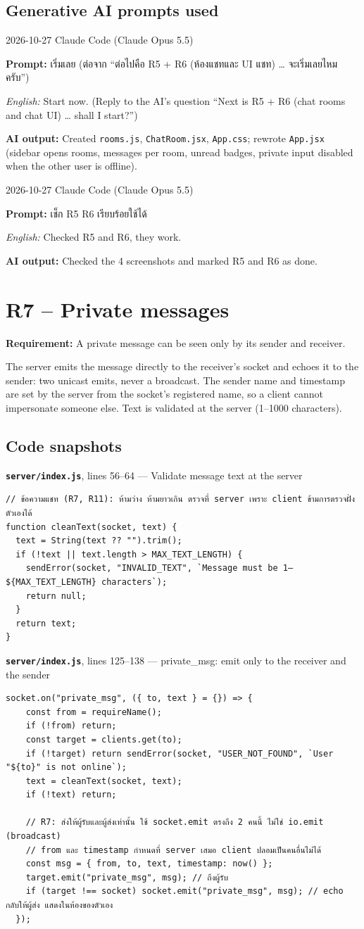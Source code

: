 \documentclass[11pt,a4paper]{article}
\newcommand{\code}[1]{\texttt{#1}}
\newcommand{\req}[1]{\begin{tcolorbox}[colback=accent!6,colframe=accent!60,boxrule=0.5pt,left=4pt,right=4pt,top=2pt,bottom=2pt]\textbf{Requirement:} #1\end{tcolorbox}}
\newcommand{\snap}[3]{\par\medskip\textbf{\code{#1}}, lines #2 --- #3}
\newcommand{\promptbox}[4]{%
\begin{tcolorbox}[colback=codebg,colframe=gray!50,boxrule=0.4pt,left=4pt,right=4pt,top=2pt,bottom=2pt]
{\small #1 \quad Claude Code (Claude Opus 5.5)}\par
\textbf{Prompt:} #2\par
\textit{English:} #3\par
\textbf{AI output:} #4
\end{tcolorbox}}
\begin{document}
\subsection*{Generative AI prompts used}
\promptbox{2026-10-27}{เริ่มเลย \newline (ต่อจาก “ต่อไปคือ R5 + R6 (ห้องแชทและ UI แชท) \ldots{} จะเริ่มเลยไหมครับ”)}{Start now. (Reply to the AI's question “Next is R5 + R6 (chat rooms and chat UI) \ldots{} shall I start?”)}{Created \code{rooms.js}, \code{ChatRoom.jsx}, \code{App.css}; rewrote \code{App.jsx} (sidebar opens rooms, messages per room, unread badges, private input disabled when the other user is offline).}
\promptbox{2026-10-27}{เช็ก R5 R6 เรียบร้อยใช้ได้}{Checked R5 and R6, they work.}{Checked the 4 screenshots and marked R5 and R6 as done.}

\clearpage
\section{R7 -- Private messages}
\req{A private message can be seen only by its sender and receiver.}

The server emits the message directly to the receiver's socket and echoes it to the
sender: two unicast emits, never a broadcast. The sender name and timestamp are set by the server
from the socket's registered name, so a client cannot impersonate someone else. Text is validated at
the server (1--1000 characters).

\subsection*{Code snapshots}
\snap{server/index.js}{56--64}{Validate message text at the server}
\begin{Verbatim}[firstnumber=56]
// ข้อความแชท (R7, R11): ห้ามว่าง ห้ามยาวเกิน ตรวจที่ server เพราะ client ข้ามการตรวจฝั่งตัวเองได้
function cleanText(socket, text) {
  text = String(text ?? "").trim();
  if (!text || text.length > MAX_TEXT_LENGTH) {
    sendError(socket, "INVALID_TEXT", `Message must be 1–${MAX_TEXT_LENGTH} characters`);
    return null;
  }
  return text;
}
\end{Verbatim}

\snap{server/index.js}{125--138}{private\_msg: emit only to the receiver and the sender}
\begin{Verbatim}[firstnumber=125]
  socket.on("private_msg", ({ to, text } = {}) => {
    const from = requireName();
    if (!from) return;
    const target = clients.get(to);
    if (!target) return sendError(socket, "USER_NOT_FOUND", `User "${to}" is not online`);
    text = cleanText(socket, text);
    if (!text) return;

    // R7: ส่งให้ผู้รับและผู้ส่งเท่านั้น ใช้ socket.emit ตรงถึง 2 คนนี้ ไม่ใช่ io.emit (broadcast)
    // from และ timestamp กำหนดที่ server เสมอ client ปลอมเป็นคนอื่นไม่ได้
    const msg = { from, to, text, timestamp: now() };
    target.emit("private_msg", msg); // ถึงผู้รับ
    if (target !== socket) socket.emit("private_msg", msg); // echo กลับให้ผู้ส่ง แสดงในห้องของตัวเอง
  });
\end{Verbatim}
\end{document}

